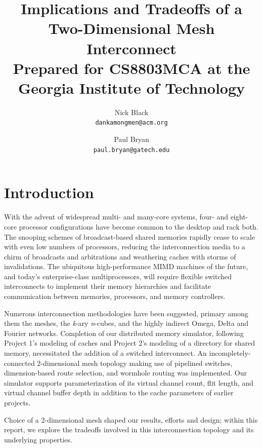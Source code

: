 \documentclass[twocolumn]{article}
\author{Nick Black\\
\texttt{dankamongmen@acm.org}
\and
Paul Bryan\\
\texttt{paul.bryan@gatech.edu}
}
\title{Implications and Tradeoffs of a\\
Two-Dimensional Mesh Interconnect\\
\small Prepared for CS8803MCA at the Georgia Institute of Technology}
\begin{document}
\maketitle

\pagestyle{headings}

\section{Introduction}

With the advent of widespread multi- and many-core systems, four- and
eight-core processor configurations have become common to the desktop and rack
both. The snooping schemes of broadcast-based shared memories rapidly cease to
scale with even low numbers of processors, reducing the interconnection media
to a chirm of broadcasts and arbitrations and weathering caches with storms of
invalidations. The ubiquitous high-performance MIMD machines of the future, and
today's enterprise-class multiprocessors, will require flexible switched
interconnects to implement their memory hierarchies and facilitate
communication between memories, processors, and memory controllers.

Numerous interconnection methodologies have been suggested, primary among them
the meshes, the \textit{k}-ary \textit{n}-cubes, and the highly indirect Omega,
Delta and Fourier networks. Completion of our distributed memory simulator,
following Project 1's modeling of caches and Project 2's modeling of a
directory for shared memory, necessitated the addition of a switched
interconnect. An incompletely-connected 2-dimensional mesh topology making use
of pipelined switches, dimension-based route selection, and wormhole routing was
implemented. Our simulator supports parameterization of its virtual channel
count, flit length, and virtual channel buffer depth in addition to the
cache parameters of earlier projects.

Choice of a 2-dimensional mesh shaped our results, efforts and design; within
this report, we explore the tradeoffs involved in this interconnection topology
and its underlying properties.
\end{document}
